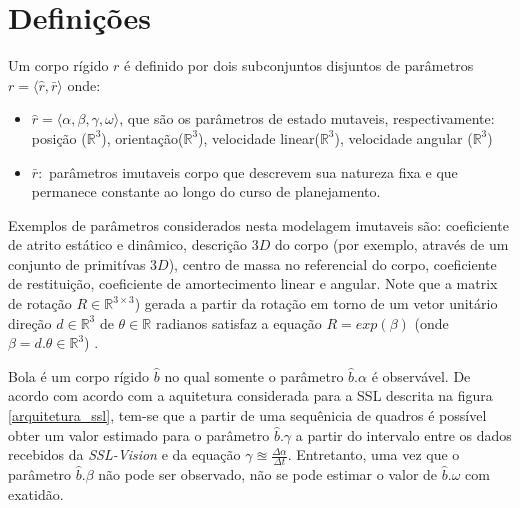 \section{Definições}

\begin{defi}
  Um corpo rígido $r$ é definido por dois subconjuntos disjuntos
  de parâmetros $r= \langle \hat{r}, \bar{r} \rangle$ onde:
  \begin{itemize}
    \item $\hat{r} = \langle \alpha, \beta, \gamma, \omega \rangle$,
    que são os parâmetros de estado mutaveis, respectivamente:
    posição ($\mathbb{R} ^{3}$), orientação($\mathbb{R} ^{3}$),
    velocidade linear($\mathbb{R} ^{3}$), velocidade angular
    ($\mathbb{R} ^{3}$)
    
    \item $\bar{r} :$ parâmetros imutaveis corpo que descrevem sua
    natureza fixa e que permanece constante ao longo do curso de 
    planejamento.
  \end{itemize}
  
  Exemplos de parâmetros considerados nesta modelagem imutaveis são:
  coeficiente de atrito estático e dinâmico, descrição $3D$ do corpo
  (por exemplo, através de um conjunto de primitívas $3D$), centro de
  massa no referencial do corpo, coeficiente de restituição,
  coeficiente de amortecimento linear e angular. Note que a matrix de
  rotação $R\in\mathbb{R}^{3\times 3}$) gerada a partir da rotação
  em torno de um vetor unitário direção $d\in\mathbb{R}^{3}$  de
  $\theta \in \mathbb{R}$ radianos satisfaz a equação
  $R = exp\left( \beta \right)$ (onde $\beta = d. \theta \in \mathbb{R} ^{3}$)
  \cite{math2robotics}.
\end{defi}

\begin{defi}[Bola]\label{def:bola}
  Bola é um corpo rígido $\hat{b}$ no qual somente o parâmetro
  $\hat{b}.\alpha$ é observável. De acordo com acordo com a
  aquitetura considerada para a SSL descrita na figura
  \ref{arquitetura_ssl}, tem-se que a partir de uma sequênicia
  de quadros é possível obter um valor estimado para o parâmetro
  $\hat{b}.\gamma$ a partir do intervalo entre os dados recebidos
  da \textit{SSL-Vision} e da equação $ \gamma \approxeq 
  \frac{\Delta \alpha}{\Delta t} $. Entretanto, uma vez que o
  parâmetro $\hat{b}.\beta$ não pode ser observado,
  não se pode estimar o valor de $\hat{b}.\omega$ com exatidão.
\end{defi}

